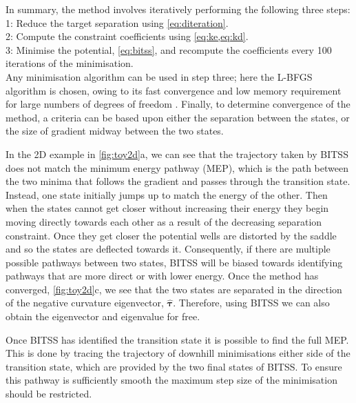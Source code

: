 \documentclass[aps,twocolumn]{revtex4}
\begin{document}
\topic In summary, the method involves iteratively performing the following three steps: \\
1: Reduce the target separation using \cref{eq:diteration}. \\
2: Compute the constraint coefficients using \cref{eq:ke,eq:kd}. \\
3: Minimise the potential, \cref{eq:bitss}, and recompute the coefficients every 100 iterations of the minimisation. \\
Any minimisation algorithm can be used in step three; here the L-BFGS algorithm is chosen, owing to its fast convergence and low memory requirement for large numbers of degrees of freedom \cite{Liu1989}.
Finally, to determine convergence of the method, a criteria can be based upon either the separation between the states, or the size of gradient midway between the two states.

\topic In the 2D example in \cref{fig:toy2d}a, we can see that the trajectory taken by BITSS does not match the minimum energy pathway (MEP), which is the path between the two minima that follows the gradient and passes through the transition state.
Instead, one state initially jumps up to match the energy of the other.
Then when the states cannot get closer without increasing their energy they begin moving directly towards each other as a result of the decreasing separation constraint.
Once they get closer the potential wells are distorted by the saddle and so the states are deflected towards it.
Consequently, if there are multiple possible pathways between two states, BITSS will be biased towards identifying pathways that are more direct or with lower energy.
Once the method has converged, \cref{fig:toy2d}c, we see that the two states are separated in the direction of the negative curvature eigenvector, $\bm{\hat{\tau}}$.
Therefore, using BITSS we can also obtain the eigenvector and eigenvalue for free.

\topic Once BITSS has identified the transition state it is possible to find the full MEP.
This is done by tracing the trajectory of downhill minimisations either side of the transition state, which are provided by the two final states of BITSS.
To ensure this pathway is sufficiently smooth the maximum step size of the minimisation should be restricted.
\end{document}
